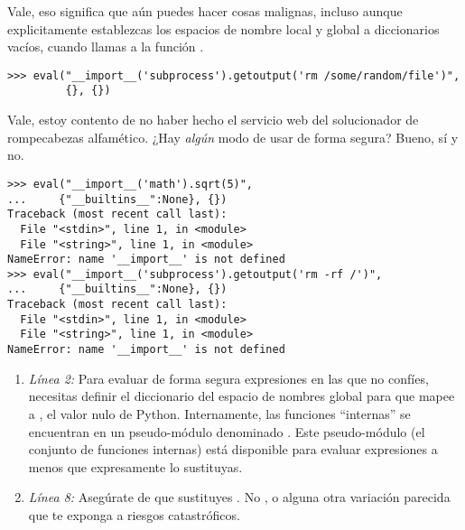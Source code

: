 Vale, eso significa que aún puedes hacer cosas malignas, incluso aunque explicitamente establezcas los espacios de nombre local y global a diccionarios vacíos, cuando llamas a la función .

\noindent\begin{minipage}{\textwidth}
\begin{lstlisting}[mathescape=True]
>>> eval("__import__('subprocess').getoutput('rm /some/random/file')",
         {}, {})
\end{lstlisting}
\end{minipage}

Vale, estoy contento de no haber hecho el servicio web del solucionador de rompecabezas alfamético. ¿Hay \emph{algún} modo de usar  de forma segura? Bueno, sí y no.

\noindent\begin{minipage}{\textwidth}
\begin{lstlisting}[mathescape=True]
>>> eval("__import__('math').sqrt(5)",
...     {"__builtins__":None}, {})
Traceback (most recent call last):
  File "<stdin>", line 1, in <module>
  File "<string>", line 1, in <module>
NameError: name '__import__' is not defined
>>> eval("__import__('subprocess').getoutput('rm -rf /')",
...     {"__builtins__":None}, {})
Traceback (most recent call last):
  File "<stdin>", line 1, in <module>
  File "<string>", line 1, in <module>
NameError: name '__import__' is not defined
\end{lstlisting}
\end{minipage}

\begin{enumerate}

\item \emph{Línea 2:} Para evaluar de forma segura expresiones en las que no confíes, necesitas definir el diccionario del espacio de nombres global para que mapee  a , el valor nulo de Python. Internamente, las funciones ``internas'' se encuentran en un pseudo-módulo denominado . Este pseudo-módulo (el conjunto de funciones internas) está disponible para evaluar expresiones a menos que expresamente lo sustituyas.

\item \emph{Línea 8:} Asegúrate de que sustituyes . No ,  o alguna otra variación parecida que te exponga a riesgos catastróficos.

\end{enumerate}


